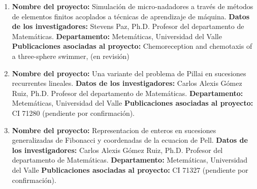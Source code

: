 \begin{spacing}{1.5}
\begin{enumerate}
    \item \textbf{Nombre del proyecto:} Simulación de micro-nadadores a
          través de métodos de elementos finitos acoplados a técnicas de aprendizaje de
          máquina. \newline
          \textbf{Datos de los investigadores:} \newline
          Stevens Paz, Ph.D. Profesor del departamento de Matemáticas. \newline
          \textbf{Departamento: } Metemáticas, Universidad del Valle \newline
          \textbf{Publicaciones asociadas al proyecto: } \newline Chemoreception
          and chemotaxis of a three-sphere swimmer, (en revisión)\newpage

          \item \textbf{Nombre del proyecto:} Una variante del problema de Pillai en sucesiones recurrentes lineales. \newline
          \textbf{Datos de los investigadores:} \newline
          Carlos Alexis Gómez Ruiz, Ph.D. Profesor del departamento de Matemáticas. \newline
          \textbf{Departamento: } Metemáticas, Universidad del Valle \newline
          \textbf{Publicaciones asociadas al proyecto: } \newline CI 71280 (pendiente por confirmación).

          \item \textbf{Nombre del proyecto:} Representacion de enteros en sucesiones generalizadas de Fibonacci y coordenadas de la ecuacion de Pell. \newline
          \textbf{Datos de los investigadores:} \newline
          Carlos Alexis Gómez Ruiz, Ph.D. Profesor del departamento de Matemáticas. \newline
          \textbf{Departamento: } Metemáticas, Universidad del Valle \newline
          \textbf{Publicaciones asociadas al proyecto: } \newline CI 71327 (pendiente por confirmación).

  \end{enumerate}

  \mylinespacing
  \mylinespacing
  \begin{tightcenter}
  \end{tightcenter}
\end{spacing}